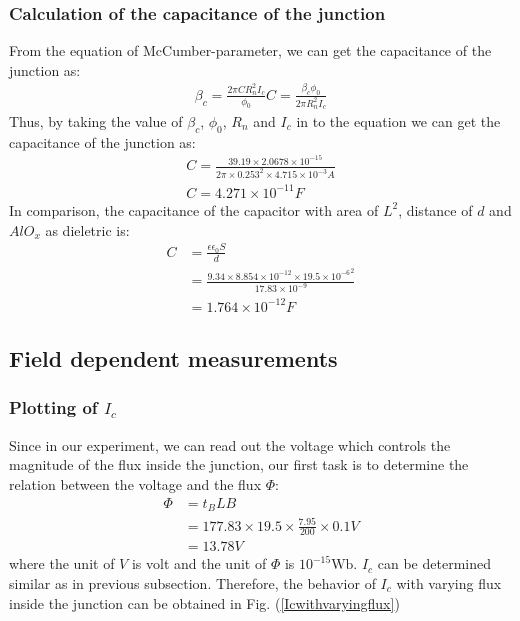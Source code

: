 \subsubsection{Calculation of the capacitance of the junction}
From the equation of McCumber-parameter, we can get the capacitance of the junction as:
\begin{align*}
    \beta_c=\frac{2\pi{C}{R_{n}^2}I_{c}}{\phi_{0}}
    C=\frac{\beta_c\phi_{0}}{2\pi{R_{n}^2}I_{c}}
\end{align*}
Thus, by taking the value of $\beta_{c}$, $\phi_{0}$, $R_{n}$ and $I_{c}$ in to the equation we can get the capacitance of the junction as:
\begin{align*}
    C=\frac{39.19\times2.0678\times10^{-15}}{2\pi\times0.253^2\times4.715\times10^{-3}A}\\
    C=4.271\times10^{-11}F
\end{align*}
In comparison, the capacitance of the capacitor with area of $L^2$, distance of $d$ and $AlO_{x}$ as dieletric is:
\begin{align*}
    C & =\frac{\epsilon\epsilon_{0}S}{d}\\
    & =\frac{9.34\times8.854\times10^{-12}\times{19.5\times10^{-6}}^2}{17.83\times10^{-9}}\\
    & =1.764\times10^{-12}F
\end{align*}

\subsection{Field dependent measurements}
\subsubsection{Plotting of $I_{c}$}

Since in our experiment, we can read out the voltage which controls
the magnitude of the flux inside the junction, our first task is to
determine the relation between the voltage and the flux $\Phi$:
\begin{align*}
\Phi & =t_{B}LB\\
 & =177.83\times19.5\times\frac{7.95}{200}\times0.1V\\
 & =13.78V
\end{align*}
where the unit of $V$ is volt and the unit of $\Phi$ is $10^{-15}\mathrm{Wb}$.
$I_{c}$ can be determined similar as in previous subsection. Therefore,
the behavior of $I_{c}$ with varying flux inside the junction can
be obtained in Fig. (\ref{Icwithvaryingflux})

